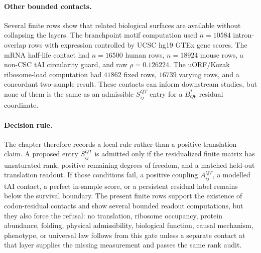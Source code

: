 \paragraph{Other bounded contacts.}
Several finite rows show that related biological surfaces are available without collapsing the layers. The branchpoint motif computation used $n=10584$ intron-overlap rows with expression controlled by UCSC hg19 GTEx gene scores. The mRNA half-life contact had $n=16500$ human rows, $n=18924$ mouse rows, a non-CSC tAI circularity guard, and raw $\rho=0.126224$. The uORF/Kozak ribosome-load computation had $41862$ fixed rows, $16739$ varying rows, and a concordant two-sample result. These contacts can inform downstream studies, but none of them is the same as an admissible $S^{QT}_{ij}$ entry for a $B^*_{Q6}$ residual coordinate.

\paragraph{Decision rule.}
The chapter therefore records a local rule rather than a positive translation claim. A proposed entry $S^{QT}_{ij}$ is admitted only if the residualized finite matrix has unsaturated rank, positive remaining degrees of freedom, and a matched held-out translation readout. If those conditions fail, a positive coupling $A^{QT}_{ij}$, a modelled tAI contact, a perfect in-sample score, or a persistent residual label remains below the survival boundary. The present finite rows support the existence of codon-residual contacts and show several bounded readout computations, but they also force the refusal: no translation, ribosome occupancy, protein abundance, folding, physical admissibility, biological function, causal mechanism, phenotype, or universal law follows from this gate unless a separate contact at that layer supplies the missing measurement and passes the same rank audit.
